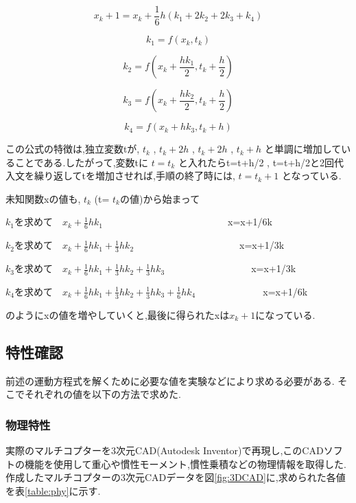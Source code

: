 \documentclass[12pt,oneside]{sotsuken_paper}
\begin{document}
\begin{equation}
	x_k+1 = x_k+\frac{1}{6}h(k_1+2k_2+2k_3+k_4)
	\label{eq1}
\end{equation}

\begin{equation}
	k_1 = f(x_k,t_k)
	\label{eq2}
\end{equation}

\begin{equation}
	k_2 = f(x_k+\frac{hk_1}{2},t_k+\frac{h}{2})
	\label{eq3}
\end{equation}

\begin{equation}
	k_3 = f(x_k+\frac{hk_2}{2},t_k+\frac{h}{2})
	\label{eq4}
\end{equation}

\begin{equation}
	k_4 = f(x_k+hk_3,t_k+h)
	\label{eq5}
\end{equation}

この公式の特徴は,独立変数tが, \(t_k\) , \(t_k+2h\) , \(t_k+2h\) , \(t_k+h\) と単調に増加していることである.したがって,変数tに \(t=t_k\) と入れたらt=t+h/2 , t=t+h/2と2回代入文を繰り返してtを増加させれば,手順の終了時には, \(t=t_k+1\) となっている.


未知関数xの値も, \(t_k\) (t= \(t_k\)の値)から始まって

\(k_1\)を求めて　\(x_k+\frac{1}{6}hk_1\)　　　　　　　　　　　　　x=x+1/6k


\(k_2\)を求めて　\(x_k+\frac{1}{6}hk_1+\frac{1}{3}hk_2\)　　　　　　　　　　　x=x+1/3k


\(k_3\)を求めて　\(x_k+\frac{1}{6}hk_1+\frac{1}{3}hk_2+\frac{1}{3}hk_3\)　　　　　　　　　x=x+1/3k


\(k_4\)を求めて　\(x_k+\frac{1}{6}hk_1+\frac{1}{3}hk_2+\frac{1}{3}hk_3+\frac{1}{6}hk_4\)　　　　　　　x=x+1/6k

のようにxの値を増やしていくと,最後に得られたxは\(x_k+1\)になっている.\cite{runge} 

\subsection{特性確認}
前述の運動方程式を解くために必要な値を実験などにより求める必要がある.
そこでそれぞれの値を以下の方法で求めた.

\subsubsection{物理特性}
実際のマルチコプターを3次元CAD(Autodesk Inventor)で再現し,このCADソフトの機能を使用して重心や慣性モーメント,慣性乗積などの物理情報を取得した.
作成したマルチコプターの3次元CADデータを図\ref{fig:3DCAD}に,求められた各値を表\ref{table:phy}に示す.
\end{document}
